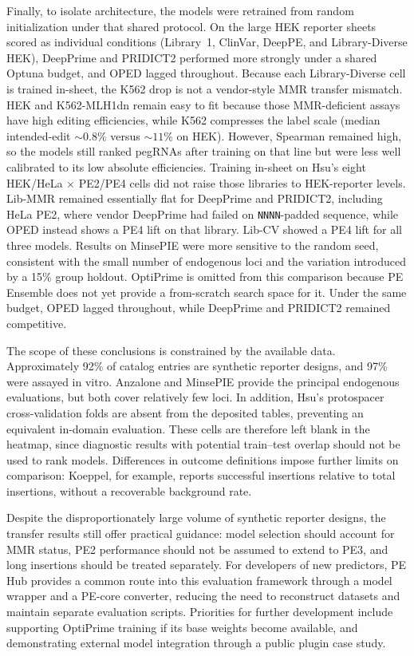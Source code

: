 \documentclass{article}
\begin{document}
Finally, to isolate architecture, the models were retrained from random initialization under that shared protocol. On the large HEK reporter sheets scored as individual conditions (Library~1, ClinVar, DeepPE, and Library-Diverse HEK), DeepPrime and PRIDICT2 performed more strongly under a shared Optuna budget, and OPED lagged throughout.
Because each Library-Diverse cell is trained in-sheet, the K562 drop is not a vendor-style MMR transfer mismatch. HEK and K562-MLH1dn remain easy to fit because those MMR-deficient assays have high editing efficiencies, while K562 compresses the label scale (median intended-edit ${\sim}0.8\%$ versus ${\sim}11\%$ on HEK). However, Spearman remained high, so the models still ranked pegRNAs after training on that line but were less well calibrated to its low absolute efficiencies. Training in-sheet on Hsu's eight HEK/HeLa $\times$ PE2/PE4 cells did not raise those libraries to HEK-reporter levels. Lib-MMR remained essentially flat for DeepPrime and PRIDICT2, including HeLa PE2, where vendor DeepPrime had failed on \texttt{NNNN}-padded sequence, while OPED instead shows a PE4 lift on that library. Lib-CV showed a PE4 lift for all three models. Results on MinsePIE were more sensitive to the random seed, consistent with the small number of endogenous loci and the variation introduced by a 15\% group holdout. OptiPrime is omitted from this comparison because PE Ensemble does not yet provide a from-scratch search space for it. Under the same budget, OPED lagged throughout, while DeepPrime and PRIDICT2 remained competitive.

The scope of these conclusions is constrained by the available data. Approximately 92\% of catalog entries are synthetic reporter designs, and 97\% were assayed in vitro. Anzalone and MinsePIE provide the principal endogenous evaluations, but both cover relatively few loci. In addition, Hsu’s protospacer cross-validation folds are absent from the deposited tables, preventing an equivalent in-domain evaluation. These cells are therefore left blank in the heatmap, since diagnostic results with potential train–test overlap should not be used to rank models. Differences in outcome definitions impose further limits on comparison: Koeppel, for example, reports successful insertions relative to total insertions, without a recoverable background rate.

Despite the disproportionately large volume of synthetic reporter designs, the transfer results still offer practical guidance: model selection should account for MMR status, PE2 performance should not be assumed to extend to PE3, and long insertions should be treated separately. For developers of new predictors, PE Hub provides a common route into this evaluation framework through a model wrapper and a PE-core converter, reducing the need to reconstruct datasets and maintain separate evaluation scripts. 
Priorities for further development include supporting OptiPrime training if its base weights become available, and demonstrating external model integration through a public plugin case study. 
\end{document}
